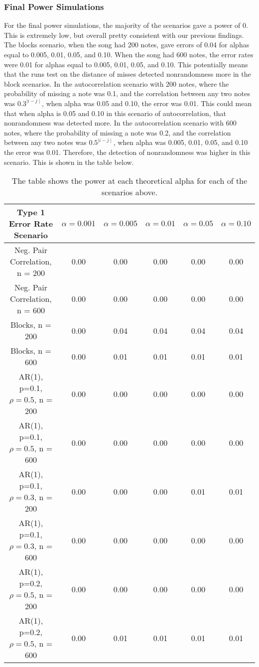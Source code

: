 \documentclass[12pt, letterpaper]{article}
\begin{document}
\subsubsection{Final Power Simulations}
For the final power simulations, the majority of the scenarios gave a power of 0. This is extremely low, but overall pretty consistent with our previous findings. The blocks scenario, when the song had 200 notes, gave errors of 0.04 for alphas equal to 0.005, 0.01, 0.05, and 0.10. When the song had 600 notes, the error rates were 0.01 for alphas equal to 0.005, 0.01, 0.05, and 0.10. This potentially means that the runs test on the distance of misses detected nonrandomness more in the block scenarios. In the autocorrelation scenario with 200 notes, where the probability of missing a note was 0.1, and the correlation between any two notes was $0.3^{\mid i-j \mid}$, when alpha was 0.05 and 0.10, the error was 0.01. This could mean that when alpha is 0.05 and 0.10 in this scenario of autocorrelation, that nonrandomness was detected more. In the autocorrelation scenario with 600 notes, where the probability of missing a note was 0.2, and the correlation between any two notes was $0.5^{\mid i-j \mid}$, when alpha was 0.005, 0.01, 0.05, and 0.10 the error was 0.01. Therefore, the detection of nonrandomness was higher in this scenario. This is shown in the table below.
\begin{table}[h]
\begin{center}
\begin{tabular}{|c|c|c|c|c|c|}
\hline
\textbf{Type 1 Error Rate Scenario} & $\alpha = 0.001$ &  $\alpha = 0.005$ &  $\alpha = 0.01$ &  $\alpha = 0.05$ &  $\alpha = 0.10$ \\
\hline
Neg. Pair Correlation, n = 200 & 0.00 & 0.00 & 0.00 & 0.00 & 0.00 \\
\hline
Neg. Pair Correlation, n = 600 & 0.00 & 0.00 & 0.00 & 0.00 & 0.00 \\
\hline
Blocks, n = 200 & 0.00 & 0.04 & 0.04 & 0.04 & 0.04 \\
\hline
Blocks, n = 600 & 0.00 & 0.01 & 0.01 & 0.01 & 0.01 \\
\hline
AR(1), p=0.1, $\rho = 0.5$, n = 200 & 0.00 & 0.00 & 0.00 & 0.00 & 0.00 \\
\hline
AR(1), p=0.1, $\rho = 0.5$, n = 600 & 0.00 & 0.00 & 0.00 & 0.00 & 0.00 \\
\hline
AR(1), p=0.1, $\rho = 0.3$, n = 200 & 0.00 & 0.00 & 0.00 & 0.01 & 0.01 \\
\hline
AR(1), p=0.1, $\rho = 0.3$, n = 600 & 0.00 & 0.00 & 0.00 & 0.00 & 0.00 \\
\hline
AR(1), p=0.2, $\rho = 0.5$, n = 200 & 0.00 & 0.00 & 0.00 & 0.00 & 0.00 \\
\hline
AR(1), p=0.2, $\rho = 0.5$, n = 600 & 0.00 & 0.01 & 0.01 & 0.01 & 0.01 \\
\hline
\end{tabular}
\end{center}
\caption{The table shows the power at each theoretical alpha for each of the scenarios above.}
\label{fig: Power Simulations using Nonparametric Bootstrap}
\end{table}
\end{document}
